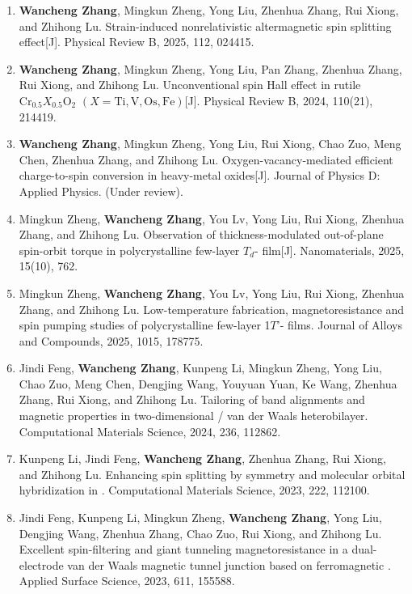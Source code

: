 \begin{publications}
\noindent
\renewcommand{\labelenumi}{[\arabic{enumi}]}
\begin{spacing}{1.25}
\begin{enumerate}
\item \textbf{Wancheng Zhang}, Mingkun Zheng, Yong Liu, Zhenhua Zhang, Rui Xiong, and Zhihong Lu. Strain-induced nonrelativistic altermagnetic spin splitting effect[J]. Physical Review B, 2025, 112, 024415.
\item \textbf{Wancheng Zhang}, Mingkun Zheng, Yong Liu, Pan Zhang, Zhenhua Zhang, Rui Xiong, and Zhihong Lu. Unconventional spin Hall effect in rutile ${\mathrm{Cr}}_{0.5}{X}_{0.5}{\mathrm{O}}_{2}$ $(X=\mathrm{Ti},\mathrm{V},\mathrm{Os},\mathrm{Fe})$[J]. Physical Review B, 2024, 110(21), 214419.
\item \textbf{Wancheng Zhang}, Mingkun Zheng, Yong Liu, Rui Xiong, Chao Zuo, Meng Chen, Zhenhua Zhang, and Zhihong Lu. Oxygen-vacancy-mediated efficient charge-to-spin conversion in heavy-metal oxides[J]. Journal of Physics D: Applied Physics. (Under review).
\item Mingkun Zheng, \textbf{Wancheng Zhang}, You Lv, Yong Liu, Rui Xiong, Zhenhua Zhang, and Zhihong Lu. Observation of thickness-modulated out-of-plane spin-orbit torque in polycrystalline few-layer $T_d$- film[J]. Nanomaterials, 2025, 15(10), 762.
\item Mingkun Zheng, \textbf{Wancheng Zhang}, You Lv, Yong Liu, Rui Xiong, Zhenhua Zhang, and Zhihong Lu. Low-temperature fabrication, magnetoresistance and spin pumping studies of polycrystalline few-layer 1$T$'- films. Journal of Alloys and Compounds, 2025, 1015, 178775.
\item Jindi Feng, \textbf{Wancheng Zhang}, Kunpeng Li, Mingkun Zheng, Yong Liu, Chao Zuo, Meng Chen, Dengjing Wang, Youyuan Yuan, Ke Wang, Zhenhua Zhang, Rui Xiong, and Zhihong Lu. Tailoring of band alignments and magnetic properties in two-dimensional / van der Waals heterobilayer. Computational Materials Science, 2024, 236, 112862.
\item Kunpeng Li, Jindi Feng, \textbf{Wancheng Zhang}, Zhenhua Zhang, Rui Xiong, and Zhihong Lu. Enhancing spin splitting by symmetry and molecular orbital hybridization in . Computational Materials Science, 2023, 222, 112100.
\item Jindi Feng, Kunpeng Li, Mingkun Zheng, \textbf{Wancheng Zhang}, Yong Liu, Dengjing Wang, Zhenhua Zhang, Chao Zuo, Rui Xiong, and Zhihong Lu. Excellent spin-filtering and giant tunneling magnetoresistance in a dual-electrode van der Waals magnetic tunnel junction based on ferromagnetic . Applied Surface Science, 2023, 611, 155588.
\end{enumerate}
\end{spacing}
\end{publications}
